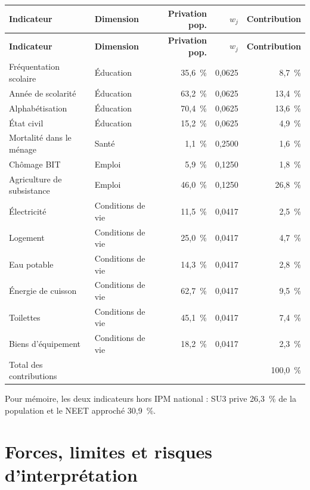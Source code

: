\documentclass[11pt,a4paper]{article}
\begin{document}
\begin{center}
\scriptsize
\begin{longtable}{@{}p{3.6cm}p{2.6cm}rrr@{}}
\toprule
\textbf{Indicateur} & \textbf{Dimension} & \textbf{Privation pop.} & $w_j$ &
\textbf{Contribution} \\
\midrule
\endfirsthead
\toprule
\textbf{Indicateur} & \textbf{Dimension} & \textbf{Privation pop.} & $w_j$ &
\textbf{Contribution} \\
\midrule
\endhead
Fréquentation scolaire & Éducation & 35,6~\% & 0,0625 & 8,7~\% \\
Année de scolarité & Éducation & 63,2~\% & 0,0625 & 13,4~\% \\
Alphabétisation & Éducation & 70,4~\% & 0,0625 & 13,6~\% \\
État civil & Éducation & 15,2~\% & 0,0625 & 4,9~\% \\
Mortalité dans le ménage & Santé & 1,1~\% & 0,2500 & 1,6~\% \\
Chômage BIT & Emploi & 5,9~\% & 0,1250 & 1,8~\% \\
Agriculture de subsistance & Emploi & 46,0~\% & 0,1250 & 26,8~\% \\
Électricité & Conditions de vie & 11,5~\% & 0,0417 & 2,5~\% \\
Logement & Conditions de vie & 25,0~\% & 0,0417 & 4,7~\% \\
Eau potable & Conditions de vie & 14,3~\% & 0,0417 & 2,8~\% \\
Énergie de cuisson & Conditions de vie & 62,7~\% & 0,0417 & 9,5~\% \\
Toilettes & Conditions de vie & 45,1~\% & 0,0417 & 7,4~\% \\
Biens d'équipement & Conditions de vie & 18,2~\% & 0,0417 & 2,3~\% \\
\midrule
Total des contributions & & & & 100,0~\% \\
\bottomrule
\end{longtable}
\end{center}

Pour mémoire, les deux indicateurs hors IPM national : SU3 prive 26,3~\% de la population et le
NEET approché 30,9~\%.

\section{Forces, limites et risques d'interprétation}
\end{document}
